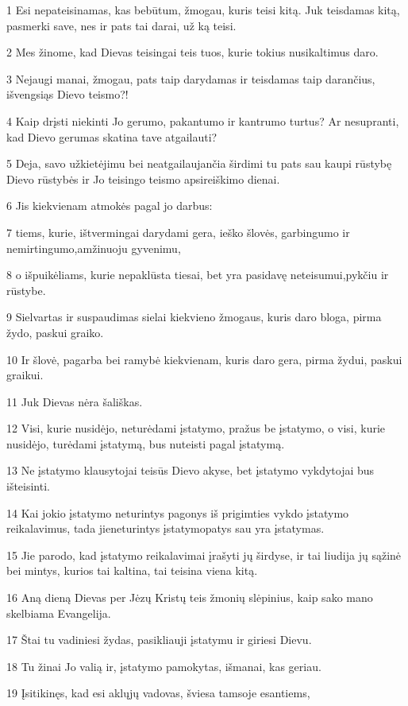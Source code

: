 \par 1 Esi nepateisinamas, kas bebūtum, žmogau, kuris teisi kitą. Juk teisdamas kitą, pasmerki save, nes ir pats tai darai, už ką teisi. 
\par 2 Mes žinome, kad Dievas teisingai teis tuos, kurie tokius nusikaltimus daro. 
\par 3 Nejaugi manai, žmogau, pats taip darydamas ir teisdamas taip darančius, išvengsiąs Dievo teismo?! 
\par 4 Kaip drįsti niekinti Jo gerumo, pakantumo ir kantrumo turtus? Ar nesupranti, kad Dievo gerumas skatina tave atgailauti? 
\par 5 Deja, savo užkietėjimu bei neatgailaujančia širdimi tu pats sau kaupi rūstybę Dievo rūstybės ir Jo teisingo teismo apsireiškimo dienai. 
\par 6 Jis kiekvienam atmokės pagal jo darbus: 
\par 7 tiems, kurie, ištvermingai darydami gera, ieško šlovės, garbingumo ir nemirtingumo,­amžinuoju gyvenimu, 
\par 8 o išpuikėliams, kurie nepaklūsta tiesai, bet yra pasidavę neteisumui,­pykčiu ir rūstybe. 
\par 9 Sielvartas ir suspaudimas sielai kiekvieno žmogaus, kuris daro bloga, pirma žydo, paskui graiko. 
\par 10 Ir šlovė, pagarba bei ramybė kiekvienam, kuris daro gera, pirma žydui, paskui graikui. 
\par 11 Juk Dievas nėra šališkas. 
\par 12 Visi, kurie nusidėjo, neturėdami įstatymo, pražus be įstatymo, o visi, kurie nusidėjo, turėdami įstatymą, bus nuteisti pagal įstatymą. 
\par 13 Ne įstatymo klausytojai teisūs Dievo akyse, bet įstatymo vykdytojai bus išteisinti. 
\par 14 Kai jokio įstatymo neturintys pagonys iš prigimties vykdo įstatymo reikalavimus, tada jie­neturintys įstatymo­patys sau yra įstatymas. 
\par 15 Jie parodo, kad įstatymo reikalavimai įrašyti jų širdyse, ir tai liudija jų sąžinė bei mintys, kurios tai kaltina, tai teisina viena kitą. 
\par 16 Aną dieną Dievas per Jėzų Kristų teis žmonių slėpinius, kaip sako mano skelbiama Evangelija. 
\par 17 Štai tu vadiniesi žydas, pasikliauji įstatymu ir giriesi Dievu. 
\par 18 Tu žinai Jo valią ir, įstatymo pamokytas, išmanai, kas geriau. 
\par 19 Įsitikinęs, kad esi aklųjų vadovas, šviesa tamsoje esantiems, 
